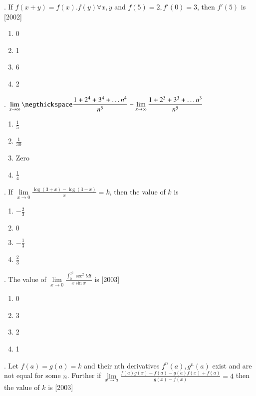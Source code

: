 \documentclass[journal,12pt,twocolumn]{IEEEtran}
\theoremstyle{remark}
\begin{document}
. If $f(x+y)=f(x).f(y)\forall x,y$ and $f(5)=2,f'(0)=3$, then $f'(5)$ is \hfill [2002]

\begin{enumerate}
    \item 0
    \item 1
    \item 6
    \item 2\\[2pt]
\end{enumerate}

. $\displaystyle\lim\limits_{x\to\infty}\negthickspace\frac{1+2^4+3^4+\dots n^4}{n^5}-\lim\limits_{x\to\infty}\frac{1+2^3+3^3+\dots n^3}{n^5}$ \rightline{[2003]}
\begin{enumerate}
    \item $\frac{1}{5}$
    \item $\frac{1}{30}$
    \item Zero
    \item $\frac{1}{4}$\\[2pt]
\end{enumerate}

. If $\displaystyle \lim\limits_{x\to 0}\frac{\log(3+x)-\log(3-x)}{x} = k$, then the value of $k$ is \\
\rightline{[2003]}
\begin{enumerate}
    \item $-\frac{2}{3}$
    \item $0$
    \item $-\frac{1}{3}$
    \item $\frac{2}{3}$\\[2pt]
\end{enumerate}

. The value of $\displaystyle \lim\limits_{x\to 0}\frac{\int_{0}^{x^2} \sec^2tdt}{x\sin x}$ is \hfill [2003]
\begin{enumerate}
    \item 0 
    \item 3
    \item 2
    \item 1\\[2pt]
\end{enumerate}

. Let $f(a)=g(a)=k$ and their nth derivatives $f^n(a),g^n(a)$ exist and are not equal for some $n$. Further if $\displaystyle \lim\limits_{x\to a}\frac{f(a)g(x)-f(a)-g(a)f(x)+f(a)}{g(x)-f(x)}=4$ then the value of $k$ is \hfill [2003]
\end{document}
